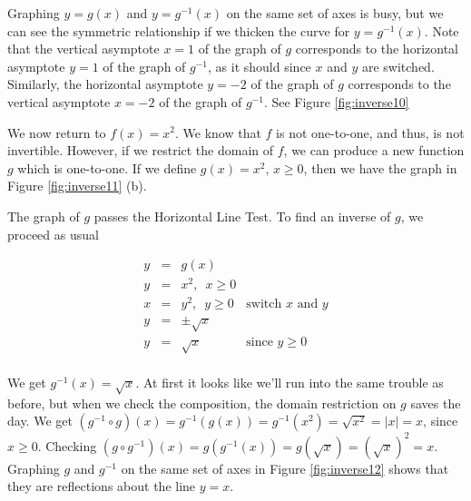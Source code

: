 {\begin{enumerate}
Graphing $y=g(x)$ and  $y = g^{-1}(x)$ on the same set of axes is busy, but we can see the symmetric relationship if we thicken the curve for $y=g^{-1}(x)$.  Note that the vertical asymptote $x=1$ of the graph of $g$ corresponds to the horizontal asymptote $y=1$ of the graph of $g^{-1}$, as it should since $x$ and $y$ are switched.  Similarly, the horizontal asymptote $y=-2$ of the graph of $g$ corresponds to the vertical asymptote $x=-2$ of the graph of $g^{-1}$. See Figure \ref{fig:inverse10}




\end{enumerate}
}

We now return to $f(x) = x^2$.  We know that $f$ is not one-to-one, and thus, is not invertible.  However, if we restrict the domain of $f$, we can produce a new function $g$ which is one-to-one.  If we define $g(x) = x^2$, $x \geq 0$, then we have the graph in Figure \ref{fig:inverse11} (b).


The graph of $g$ passes the Horizontal Line Test.  To find an inverse of $g$, we proceed as usual

\[ \begin{array}{rclr}
y & = & g(x) & \\
y & = & x^2, \, \, \, x \geq 0 & \\
x & = & y^2, \, \, \, y \geq 0 & \mbox{switch $x$ and $y$}\\
y & = & \pm \sqrt{x}  & \\
y & = & \sqrt{x} & \mbox{since $y \geq 0$} \\
\end{array} \]

We get $g^{-1}(x) = \sqrt{x}$.  At first it looks like we'll run into the same trouble as before, but when we check the composition, the domain restriction on $g$ saves the day.  We get  $\left(g^{-1} \circ g\right) (x) = g^{-1}(g(x)) = g^{-1}\left(x^2\right) = \sqrt{x^2} = |x| = x$, since $x \geq 0$.  Checking $\left( g \circ g^{-1}\right)(x) = g\left(g^{-1}(x)\right) = g\left(\sqrt{x}\right) = \left(\sqrt{x}\right)^2 = x$.  Graphing $g$ and $g^{-1}$ on the same set of axes in Figure \ref{fig:inverse12} shows that they are reflections about the line $y=x$.



